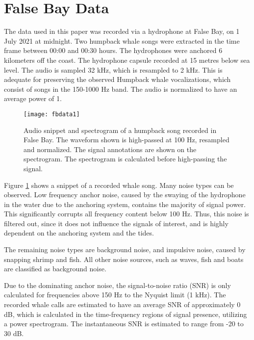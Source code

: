 \section{False Bay Data}
The data used in this paper was recorded via a hydrophone at False Bay, on 1 July 2021 at midnight. Two humpback whale songs were extracted in the time frame between 00:00 and 00:30 hours. The hydrophones were anchored 6 kilometers off the coast. The hydrophone capsule recorded at 15 metres below sea level. The audio is sampled 32 kHz, which is resampled to 2 kHz. This is adequate for preserving the observed Humpback whale vocalizations, which consist of songs in the 150-1000 Hz band. The audio is normalized to have an average power of 1.

\begin{figure}[h!]
	\centering
	\texttt{[image: fbdata1]}
	\caption[Audio snippet and spectrogram of a humpback song recorded in False Bay.]{Audio snippet and spectrogram of a humpback song recorded in False Bay. The waveform shown is high-passed at 100 Hz, resampled and normalized. The signal annotations are shown on the spectrogram. The spectrogram is calculated before high-passing the signal.}
	\label{fig:fbdata1}
\end{figure}

Figure \ref{fig:fbdata1} shows a snippet of a recorded whale song. Many noise types can be observed. Low frequency anchor noise, caused by the swaying of the hydrophone in the water due to the anchoring system, contains the majority of signal power. This significantly corrupts all frequency content below 100 Hz. Thus, this noise is filtered out, since it does not influence the signals of interest, and is highly dependent on the anchoring system and the tides.

The remaining noise types are background noise, and impulsive noise, caused by snapping shrimp and fish. All other noise sources, such as waves, fish and boats are classified as background noise. %

Due to the dominating anchor noise, the signal-to-noise ratio (SNR) is only calculated for frequencies above 150 Hz to the Nyquist limit (1 kHz). The recorded whale calls are estimated to have an average SNR of approximately 0 dB, which is calculated in the time-frequency regions of signal presence, utilizing a power spectrogram. The instantaneous SNR is estimated to range from -20 to 30 dB.

